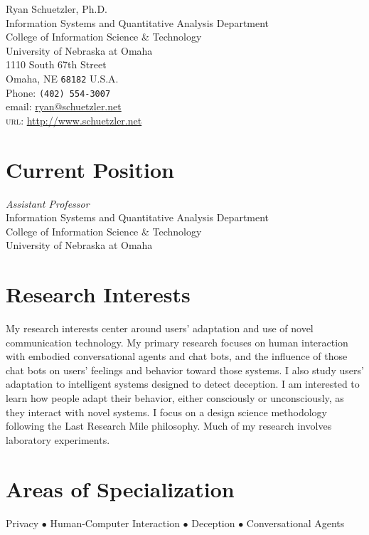 \documentclass[10pt, letter]{article}
\begin{document}
{\LARGE Ryan Schuetzler, Ph.D.}\\[1cm]
 Information Systems and Quantitative Analysis Department\\
 College of Information Science \& Technology\\
 University of Nebraska at Omaha\\
 1110 South 67th Street\\
 Omaha, NE \texttt{68182}
U.S.A.\\[.2cm]
Phone: \texttt{(402) 554-3007}\\[.2cm]
email: \href{mailto:ryan@schuetzler.net}{ryan@schuetzler.net}\\
\textsc{url}: \href{http://www.schuetzler.net}{http://www.schuetzler.net}\\ 

\section*{Current Position}
\emph{Assistant Professor}\\
Information Systems and Quantitative Analysis Department\\
College of Information Science \& Technology\\
University of Nebraska at Omaha


\section*{Research Interests}

My research interests center around users' adaptation and use of novel
communication technology. My primary research focuses on human interaction with
embodied conversational agents and chat bots, and the influence of those chat
bots on users' feelings and behavior toward those systems. I also study users'
adaptation to intelligent systems designed to detect deception. I am interested
to learn how people adapt their behavior, either consciously or unconsciously,
as they interact with novel systems. I focus on a design science methodology
following the Last Research Mile philosophy. Much of my research involves
laboratory experiments.

\section*{Areas of Specialization}
Privacy $\bullet$ Human-Computer Interaction $\bullet$ Deception $\bullet$
Conversational Agents
\end{document}
